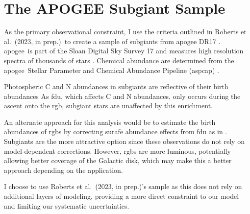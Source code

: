 \documentclass[12pt,oneside,letterpaper]{report}
\newcommand{\apogee}{\gls{apogee}}
\newcommand{\citetjack}{Roberts et al.~(2023, in prep.)}
\begin{document}
\section{The APOGEE Subgiant Sample}\label{sec:jack}

As the primary observational constraint, I use the criteria outlined in \citetjack~to create a sample of \gls{subgiant}s from \apogee{} DR17 \citep{apogee17}. \apogee\ is part of the Sloan Digital Sky Survey 17 and measures high resolution spectra of thousands of stars \cite{sdss17}. Chemical abundance are determined from the \apogee\ Stellar Parameter and Chemical Abundance Pipeline ({\sc aspcap}) \citep{aspcap}.  


Photospheric C and N abundances in \gls{subgiant}s are reflective of their birth abundances \citep{gilroy89, korn+07, lind+08, souto+18, souto19} As \gls{fdu}, which affects C and N abundances, only occurs during the ascent onto the \gls{rgb}, \gls{subgiant} stars are unaffected by this enrichment. 

An alternate approach for this analysis would be to estimate the birth abundances of \gls{rgb}s by correcting surafe abundance effects from \gls{fdu} as in \cite{vincenzo+21}. Subgiants are the more attractive option since these observations do not rely on model-dependent corrections. However, \gls{rgb}s are more luminous, potentially allowing better coverage of the Galactic disk, which may make this a better approach depending on the application.


I choose to use \citetjack's sample as this does not rely on additional layers of modeling, providing a more direct constraint to our model and limiting our systematic uncertainties.
\end{document}
